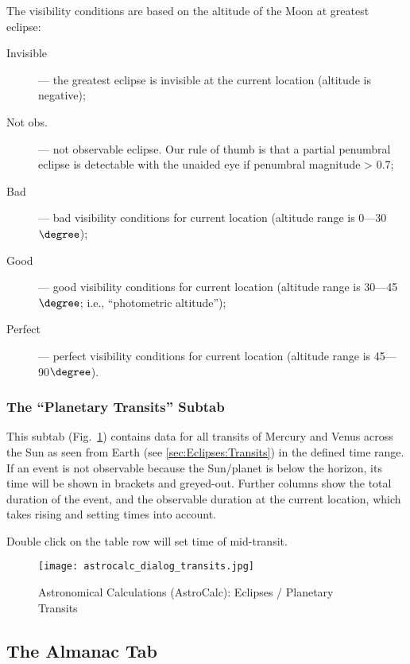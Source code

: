 The visibility conditions are based on the altitude of the Moon at greatest eclipse:
\begin{description}
  \item[Invisible] --- the greatest eclipse is invisible at the current location (altitude is negative);
  \item[Not obs.] --- not observable eclipse. Our rule of thumb is that a partial penumbral eclipse is detectable with the unaided eye if penumbral magnitude > 0.7;
  \item[Bad] --- bad visibility conditions for current location (altitude range is 0---30$\degree$);
  \item[Good] --- good visibility conditions for current location (altitude range is 30---45$\degree$; i.e., ``photometric altitude'');
  \item[Perfect] --- perfect visibility conditions for current location (altitude range is 45---90$\degree$).
\end{description}

\subsubsection{The ``Planetary Transits'' Subtab}
\label{sec:gui:AstroCalc:Eclipses:PlanetaryTransits}

This subtab (Fig.~\ref{fig:gui:AstroCalc:Eclipses:PlanetaryTransits})
contains data for all transits of Mercury and Venus across the Sun as
seen from Earth (see \ref{sec:Eclipses:Transits}) in the defined time
range.  If an event is not observable because the Sun/planet is below
the horizon, its time will be shown in brackets and
greyed-out. Further columns show the total duration of the event, and
the observable duration at the current location, which takes rising
and setting times into account.

Double click on the table row will set time of mid-transit.

\begin{figure}[htp]
\centering\texttt{[image: astrocalc\_dialog\_transits.jpg]}
\caption{Astronomical Calculations (AstroCalc): Eclipses / Planetary Transits}
\label{fig:gui:AstroCalc:Eclipses:PlanetaryTransits}
\end{figure}

\subsection{The Almanac Tab}
\label{sec:gui:AstroCalc:Almanac}

